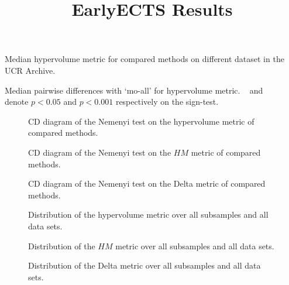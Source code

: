 \documentclass[a4paper]{article}
\title{EarlyECTS Results}
\newcommand{\signif}{\rlap{\smash{\textsuperscript{*}}}}
\newcommand{\ssignif}{\rlap{\smash{\textsuperscript{**}}}}
\begin{document}
\setlength\tabcolsep{7 pt}
\begin{table}[!htbp]%
    \tiny
    \makebox[\textwidth][c]{%
    }%
    \caption{Median hypervolume metric for compared methods on different dataset in the UCR Archive.}%
\end{table}
\begin{table}[!htbp]%
    \tiny
    \makebox[\textwidth][c]{%
    }%
    \caption{Median pairwise differences with `mo-all' for hypervolume metric. \signif~ and \ssignif~~ denote $p < 0.05$ and $p < 0.001$ respectively on the sign-test.}%
\end{table}
\pagebreak
\begin{figure}[H]%
    \caption{CD diagram of the Nemenyi test on the hypervolume metric of compared methods.}%
\end{figure}%
\begin{figure}[H]%
    \caption{CD diagram of the Nemenyi test on the $HM$ metric of compared methods.}%
\end{figure}%
\begin{figure}[H]%
    \caption{CD diagram of the Nemenyi test on the Delta metric of compared methods.}%
\end{figure}%
\begin{figure}[H]%
    \caption{Distribution of the hypervolume metric over all subsamples and all data sets.}%
\end{figure}%
\begin{figure}[H]%
    \caption{Distribution of the $HM$ metric over all subsamples and all data sets.}%
\end{figure}%
\begin{figure}[H]%
    \caption{Distribution of the Delta metric over all subsamples and all data sets.}%
\end{figure}%
\pagebreak
\end{document}
